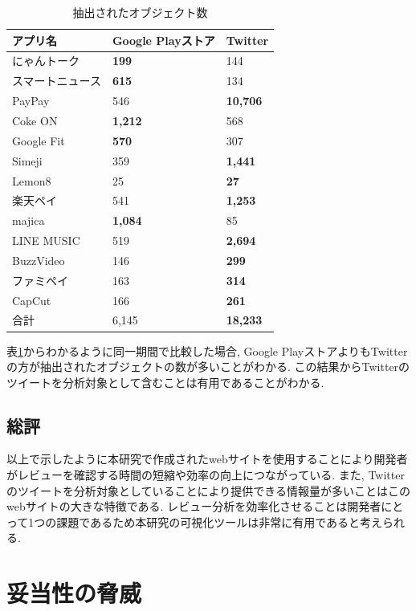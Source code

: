 \begin{table}[H]
  \small
  \caption{抽出されたオブジェクト数}
  \label{tb:app_count}
  \begin{center}
  \begin{tabularx}{\linewidth}{X|X|X}
    \hline
    アプリ名&Google Playストア&Twitter\\\hline\hline
    にゃんトーク&\textbf{199}&144\\\hline
    スマートニュース&\textbf{615}&134\\\hline
    PayPay&546&\textbf{10,706}\\\hline
    Coke ON&\textbf{1,212}&568\\\hline
    Google Fit&\textbf{570}&307\\\hline
    Simeji&359&\textbf{1,441}\\\hline
    Lemon8&25&\textbf{27}\\\hline
    楽天ペイ&541&\textbf{1,253}\\\hline
    majica&\textbf{1,084}&85\\\hline
    LINE MUSIC&519&\textbf{2,694}\\\hline
    BuzzVideo&146&\textbf{299}\\\hline
    ファミペイ&163&\textbf{314}\\\hline
    CapCut&166&\textbf{261}\\\hline\hline
    合計&6,145&\textbf{18,233}\\\hline
  \end{tabularx}\end{center}
\end{table}

\noindent
表\ref{tb:app_count}からわかるように同一期間で比較した場合, Google PlayストアよりもTwitterの方が抽出されたオブジェクトの数が多いことがわかる. 
この結果からTwitterのツイートを分析対象として含むことは有用であることがわかる. 

\subsection{総評}
以上で示したように本研究で作成されたwebサイトを使用することにより開発者がレビューを確認する時間の短縮や効率の向上につながっている. また, Twitterのツイートを分析対象としていることにより提供できる情報量が多いことはこのwebサイトの大きな特徴である. レビュー分析を効率化させることは開発者にとって1つの課題であるため本研究の可視化ツールは非常に有用であると考えられる. 

\section{妥当性の脅威}
